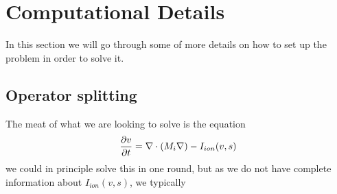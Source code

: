 \section{Computational Details}
In this section we will go through some of more details on how to set up the problem in order to solve it.  
\subsection{Operator splitting}
The meat of what we are looking to solve is the equation
\begin{equation}
 {\partial v \over \partial t} = \nabla \cdot (M_i \nabla) - I_{ion} (v,s)
\end{equation}
we could in principle solve this in one round, but as we do not have complete information about $I_{ion}(v,s)$, we typically 